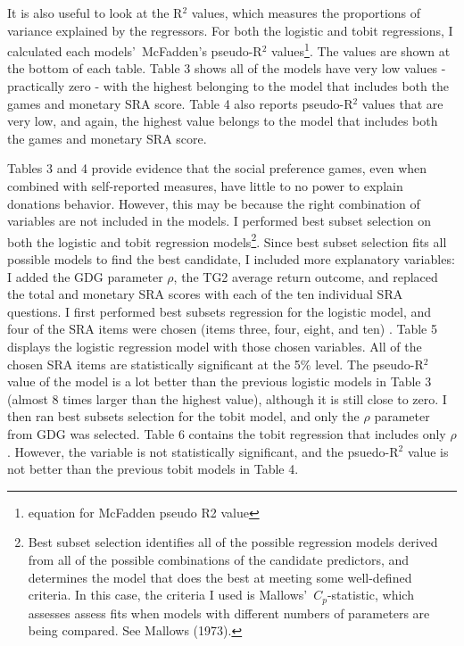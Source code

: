 \documentclass[12pt]{article}
\begin{document}
{It is also useful to look at the R$^{2}$ values, which measures the proportions of variance explained by the regressors. For both the logistic and tobit regressions, I calculated each models\rq \ McFadden\rq s pseudo-R$^{2}$ values\footnote{\color{blue}equation for McFadden pseudo R2 value}. The values are shown at the bottom of each table. Table 3 shows all of the models have very low values - practically zero - with the highest belonging to the model that includes both the games and monetary SRA score. Table 4 also reports pseudo-R$^{2}$ values that are very low, and again, the highest value belongs to the model that includes both the games and monetary SRA score. 

Tables 3 and 4 provide evidence that the social preference games, even when combined with self-reported measures, have little to no power to explain donations behavior. However, this may be because the right combination of variables are not included in the models. I performed best subset selection on both the logistic and tobit regression models\footnote{Best subset selection identifies all of the possible regression models derived from all of the possible combinations of the candidate predictors, and determines the model that does the best at meeting some well-defined criteria. In this case, the criteria I used is Mallows\rq \ \(C_{p}\)-statistic, which assesses assess fits when models with different numbers of parameters are being compared.  See Mallows (1973).}. Since best subset selection fits all possible models to find the best candidate, I included more explanatory variables: I added the GDG parameter \(\rho\), the TG2 average return outcome, and replaced the total and monetary SRA scores with each of the ten individual SRA questions. I first performed best subsets regression for the logistic model, and four of the SRA items were chosen (items three, four, eight, and ten) . Table 5 displays the logistic regression model with those chosen variables. All of the chosen SRA items are statistically significant at the 5\% level. The pseudo-R$^{2}$ value of the model is a lot better than the previous logistic models in Table 3 (almost 8 times larger than the highest value), although it is still close to zero. I then ran best subsets selection for the tobit model, and only the \(\rho\) parameter from GDG was selected. Table 6 contains the tobit regression that includes only \(\rho\). However, the variable is not statistically significant, and the psuedo-R$^{2}$ value is not better than the previous tobit models in Table 4.

}
\end{document}
